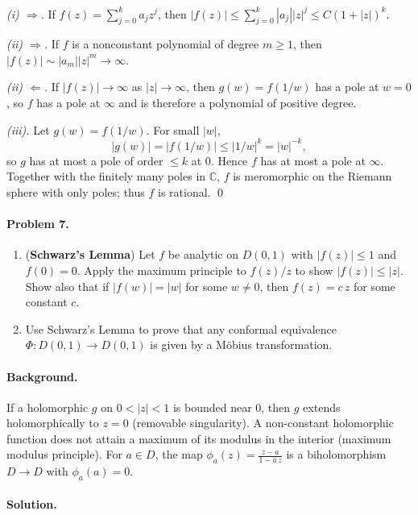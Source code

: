 \documentclass[11pt,a4paper]{article}
\theoremstyle{definition}
\theoremstyle{definition}
\theoremstyle{plain}
\theoremstyle{remark}
\begin{document}
\smallskip
\emph{(i) $\Rightarrow$.}
If $f(z)=\sum_{j=0}^k a_j z^j$, then $|f(z)|\le \sum_{j=0}^k |a_j||z|^j \le C(1+|z|)^k$.

\medskip
\emph{(ii) $\Rightarrow$.}
If $f$ is a nonconstant polynomial of degree $m\ge 1$, then $|f(z)|\sim |a_m||z|^m\to\infty$.

\emph{(ii) $\Leftarrow$.}
If $|f(z)|\to\infty$ as $|z|\to\infty$, then $g(w)=f(1/w)$ has a pole at $w=0$, so $f$ has a pole at $\infty$ and is therefore a polynomial of positive degree.

\medskip
\emph{(iii).}
Let $g(w)=f(1/w)$. For small $|w|$,
\[
|g(w)|=|f(1/w)|\le |1/w|^k=|w|^{-k},
\]
so $g$ has at most a pole of order $\le k$ at $0$. Hence $f$ has at most a pole at $\infty$. Together with the finitely many poles in $\mathbb C$, $f$ is meromorphic on the Riemann sphere with only poles; thus $f$ is rational.
\qed

\paragraph{Problem 7.}
\begin{enumerate}[label=(\roman*)]
	\item (\textbf{Schwarz's Lemma}) Let $f$ be analytic on $D(0,1)$ with $|f(z)|\le 1$ and $f(0)=0$.
	Apply the maximum principle to $f(z)/z$ to show $|f(z)|\le |z|$. Show also that if $|f(w)|=|w|$ for some $w\neq 0$, then $f(z)=c\,z$ for some constant $c$.
	
	\item Use Schwarz's Lemma to prove that any conformal equivalence $\Phi:D(0,1)\to D(0,1)$ is given by a Möbius transformation.
\end{enumerate}

\paragraph{Background.}
If a holomorphic $g$ on $0<|z|<1$ is bounded near $0$, then $g$ extends holomorphically to $z=0$ (removable singularity).
A non-constant holomorphic function does not attain a maximum of its modulus in the interior (maximum modulus principle).
For $a\in D$, the map $\displaystyle \phi_a(z)=\frac{z-a}{1-\overline a\,z}$ is a biholomorphism $D\to D$ with $\phi_a(a)=0$.

\paragraph{Solution.}
\end{document}
